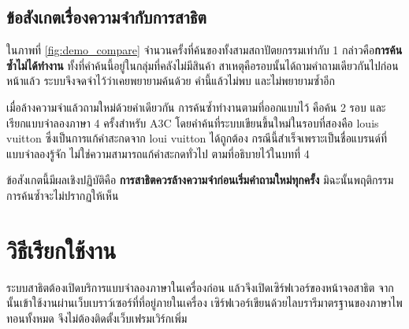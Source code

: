 \subsection*{ข้อสังเกตเรื่องความจำกับการสาธิต}

ในภาพที่ \ref{fig:demo_compare} จำนวนครั้งที่ค้นของทั้งสามสถาปัตยกรรมเท่ากับ 1
กล่าวคือ\textbf{การค้นซ้ำไม่ได้ทำงาน} ทั้งที่คำค้นนี้อยู่ในกลุ่มที่คลังไม่มีสินค้า
สาเหตุคือรอบนั้นได้ถามคำถามเดียวกันไปก่อนหน้าแล้ว ระบบจึงจดจำไว้ว่าเคยพยายามค้นด้วย
คำนี้แล้วไม่พบ และไม่พยายามซ้ำอีก

เมื่อล้างความจำแล้วถามใหม่ด้วยคำเดียวกัน การค้นซ้ำทำงานตามที่ออกแบบไว้ คือค้น 2 รอบ
และเรียกแบบจำลองภาษา 4 ครั้งสำหรับ A3C โดยคำค้นที่ระบบเขียนขึ้นใหม่ในรอบที่สองคือ
louis vuitton ซึ่งเป็นการแก้คำสะกดจาก loui vuitton ได้ถูกต้อง
กรณีนี้สำเร็จเพราะเป็นชื่อแบรนด์ที่แบบจำลองรู้จัก ไม่ใช่ความสามารถแก้คำสะกดทั่วไป
ตามที่อธิบายไว้ในบทที่ 4

ข้อสังเกตนี้มีผลเชิงปฏิบัติคือ \textbf{การสาธิตควรล้างความจำก่อนเริ่มคำถามใหม่ทุกครั้ง}
มิฉะนั้นพฤติกรรมการค้นซ้ำจะไม่ปรากฏให้เห็น

\section*{วิธีเรียกใช้งาน}

ระบบสาธิตต้องเปิดบริการแบบจำลองภาษาในเครื่องก่อน แล้วจึงเปิดเซิร์ฟเวอร์ของหน้าจอสาธิต
จากนั้นเข้าใช้งานผ่านเว็บเบราว์เซอร์ที่ที่อยู่ภายในเครื่อง
เซิร์ฟเวอร์เขียนด้วยไลบรารีมาตรฐานของภาษาไพทอนทั้งหมด จึงไม่ต้องติดตั้งเว็บเฟรมเวิร์กเพิ่ม
